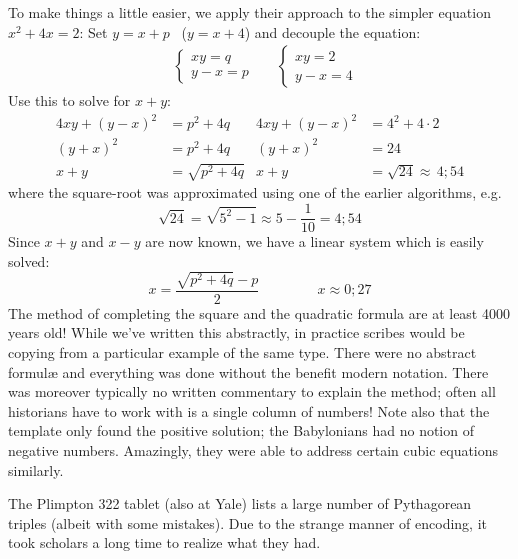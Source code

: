 To make things a little easier, we apply their approach to the simpler equation $x^2+4x=2$:\smallbreak
Set $y=x+p$ \ ($y=x+4$) and decouple the equation:
\begin{align*}
	&
	\begin{cases}
		xy=q\\
		y-x=p
	\end{cases}
	&&
	\begin{cases}
		xy=2\\
		y-x=4
	\end{cases}
\end{align*}
Use this to solve for $x+y$:
\begin{align*}
	4xy+(y-x)^2&=p^2+4q &4xy+(y-x)^2&=4^2+4\cdot 2\\
	(y+x)^2&=p^2+4q &(y+x)^2&=24\\
	x+y&=\sqrt{p^2+4q} &x+y&=\sqrt{24}\approx\,4;54
\end{align*}
where the square-root was approximated using one of the earlier algorithms, e.g.
\[
	\sqrt{24}=\sqrt{5^2-1}\approx 5-\frac{1}{10}=4;54
\]
Since $x+y$ and $x-y$ are now known, we have a linear system which is easily solved:
\[
	x=\frac{\sqrt{p^2+4q}-p}2 \hspace{50pt} x\approx 0;27
\]
The method of completing the square and the quadratic formula are at least 4000 years old!
\smallbreak
While we've written this abstractly, in practice scribes would be copying from a particular example of the same type. There were no abstract formulæ and everything was done without the benefit modern notation. There was moreover typically no written commentary to explain the method; often all historians have to work with is a single column of numbers!
\smallbreak
Note also that the template only found the positive solution; the Babylonians had no notion of negative numbers. Amazingly, they were able to address certain cubic equations similarly.\smallbreak


The Plimpton 322 tablet (also at Yale) lists a large number of Pythagorean triples (albeit with some mistakes). Due to the strange manner of encoding, it took scholars a long time to realize what they had.
	


